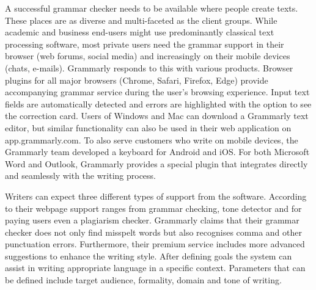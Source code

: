 \documentclass[runningheads]{llncs}
\let\OldTextregistered\textregistered
\renewcommand{\textregistered}{\OldTextregistered\xspace}
\begin{document}
A successful grammar checker needs to be available where people create texts. These places are as diverse and multi-faceted as the client groups. While academic and business end-users might use predominantly classical text processing software, most private users need the grammar support in their browser (web forums, social media) and increasingly on their mobile devices (chats, e-mails). Grammarly\textregistered responds to this with various products. Browser plugins for all major browsers (Chrome, Safari, Firefox, Edge) provide accompanying grammar service during the user's browsing experience. Input text fields are automatically detected and errors are highlighted with the option to see the correction card. Users of Windows and Mac can download a Grammarly\textregistered text editor, but similar functionality can also be used in their web application on app.grammarly.com. To also serve customers who write on mobile devices, the Grammarly\textregistered team developed a keyboard for Android and iOS. For both Microsoft Word and Outlook, Grammarly\textregistered provides a special plugin that integrates directly and seamlessly with the writing process.

Writers can expect three different types of support from the software. According to their webpage \parencite{noauthor_grammarly_nodate} support ranges from grammar checking, tone detector and for paying users even a plagiarism checker. Grammarly\textregistered claims that their grammar checker does not only find misspelt words but also recognises comma and other punctuation errors. Furthermore, their premium service includes more advanced suggestions to enhance the writing style. After defining goals the system can assist in writing appropriate language in a specific context. Parameters that can be defined include target audience, formality, domain and tone of writing.   
\end{document}
